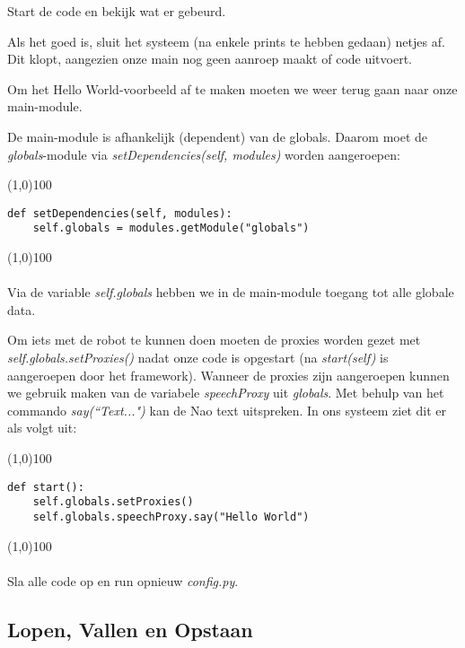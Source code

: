 \documentclass[dutch, a4paper]{article}
\begin{document}
Start de code en bekijk wat er gebeurd.

Als het goed is, sluit het systeem (na enkele prints te hebben gedaan) netjes af. Dit klopt, aangezien onze main nog geen aanroep maakt of code uitvoert.

Om het Hello World-voorbeeld af te maken moeten we weer terug gaan naar onze main-module.

De main-module is afhankelijk (dependent) van de globals. Daarom moet de \textit{globals}-module via \textit{setDependencies(self, modules)} worden aangeroepen:

\noindent \line(1,0){100}
\begin{verbatim}
def setDependencies(self, modules):
    self.globals = modules.getModule("globals")
\end{verbatim}
\noindent \line(1,0){100}
\\\\
Via de variable \textit{self.globals} hebben we in de main-module toegang tot alle globale data.

Om iets met de robot te kunnen doen moeten de proxies worden gezet met \textit{self.globals.setProxies()} nadat onze code is opgestart (na \textit{start(self)} is aangeroepen door het framework).
Wanneer de proxies zijn aangeroepen kunnen we gebruik maken van de variabele \textit{speechProxy} uit \textit{globals}.
Met behulp van het commando \textit{say(``Text...")} kan de Nao text uitspreken. In ons systeem ziet dit er als volgt uit:

\noindent \line(1,0){100}
\begin{verbatim}
def start():
    self.globals.setProxies()
    self.globals.speechProxy.say("Hello World")
\end{verbatim}
\noindent \line(1,0){100}
\\\\
Sla alle code op en run opnieuw \textit{config.py}.

\subsection{Lopen, Vallen en Opstaan}
\indent \\\\\\\\\\\\\\\\\\\\\\\\\\\\\\\\
\end{document}
